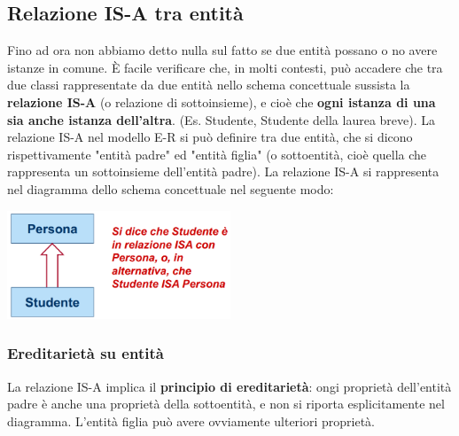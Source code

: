 \documentclass[12pt]{article}
\begin{document}
\subsection{Relazione IS-A tra entità}
Fino ad ora non abbiamo detto nulla sul fatto se due entità possano o no avere istanze in comune.
È facile verificare che, in molti contesti, può accadere che tra due classi rappresentate da due entità nello schema concettuale sussista la \textbf{relazione IS-A} (o relazione di sottoinsieme), e cioè che \textbf{ogni istanza di una sia anche istanza dell'altra}.
(Es. Studente, Studente della laurea breve).
La relazione IS-A nel modello E-R si può definire tra due entità, che si dicono rispettivamente "entità padre" ed "entità figlia" (o sottoentità, cioè quella che rappresenta un sottoinsieme dell'entità padre).
La relazione IS-A si rappresenta nel diagramma dello schema concettuale nel seguente modo:
\begin{center}
    \includegraphics[width = 0.50\textwidth]{Images/36.PNG}
\end{center}
\subsubsection{Ereditarietà su entità}
La relazione IS-A implica il \textbf{principio di ereditarietà}: ongi proprietà dell'entità padre è anche una proprietà della sottoentità, e non si riporta esplicitamente nel diagramma.
L'entità figlia può avere ovviamente ulteriori proprietà.
\end{document}

